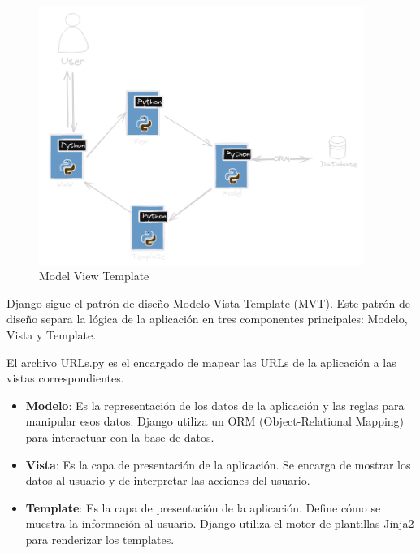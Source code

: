 \documentclass[
  a4paper,
  DIV=11,
  numbers=noendperiod,
  onepage,
  openany]{scrreprt}
\begin{document}
\begin{figure}[H]

{\centering \includegraphics[width=4.16667in,height=\textheight]{images/model-template-view.png}

}

\caption{Model View Template}

\end{figure}%

Django sigue el patrón de diseño Modelo Vista Template (MVT). Este
patrón de diseño separa la lógica de la aplicación en tres componentes
principales: Modelo, Vista y Template.

\begin{tcolorbox}[enhanced jigsaw, title=\textcolor{quarto-callout-tip-color}{\faLightbulb}\hspace{0.5em}{Tip}, colback=white, rightrule=.15mm, opacityback=0, colframe=quarto-callout-tip-color-frame, titlerule=0mm, opacitybacktitle=0.6, breakable, coltitle=black, colbacktitle=quarto-callout-tip-color!10!white, bottomtitle=1mm, toptitle=1mm, left=2mm, arc=.35mm, toprule=.15mm, leftrule=.75mm, bottomrule=.15mm]

El archivo URLs.py es el encargado de mapear las URLs de la aplicación a
las vistas correspondientes.

\end{tcolorbox}

\begin{itemize}
\item
  \textbf{Modelo}: Es la representación de los datos de la aplicación y
  las reglas para manipular esos datos. Django utiliza un ORM
  (Object-Relational Mapping) para interactuar con la base de datos.
\item
  \textbf{Vista}: Es la capa de presentación de la aplicación. Se
  encarga de mostrar los datos al usuario y de interpretar las acciones
  del usuario.
\item
  \textbf{Template}: Es la capa de presentación de la aplicación. Define
  cómo se muestra la información al usuario. Django utiliza el motor de
  plantillas Jinja2 para renderizar los templates.
\end{itemize}
\end{document}
